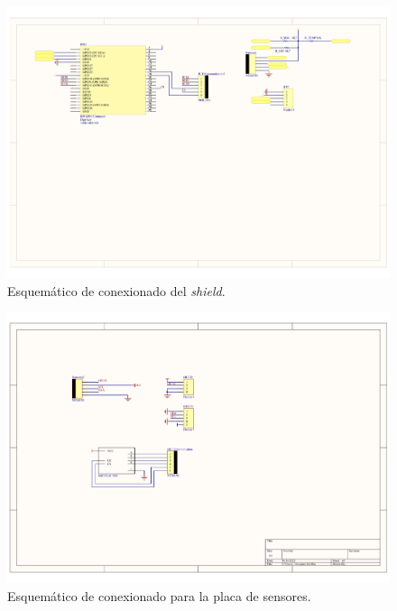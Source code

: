 \begin{figure}[H]
	\centering
	\includegraphics[width=0.9\linewidth]{ImagenesApendice/esquematico}
	\caption{Esquemático de conexionado del \textit{shield}.}
	\label{fig:esquematico_conexionado_1}
\end{figure}

\begin{figure}[H]
	\centering
	\includegraphics[width=0.9\linewidth]{ImagenesApendice/esquematicoSensores}
	\caption{Esquemático de conexionado para la placa de sensores.}
	\label{fig:esquematico_conexionado_2}
\end{figure}


